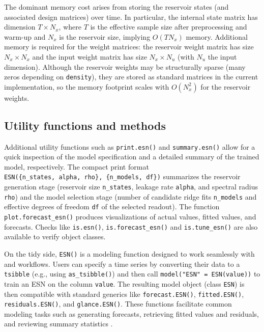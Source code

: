The dominant memory cost arises from storing the reservoir states (and associated design matrices) over time. In particular, the internal state matrix has dimension \(T \times N_x\), where \(T\) is the effective sample size after preprocessing and warm-up and \(N_x\) is the reservoir size, implying \(O(TN_x)\) memory. Additional memory is required for the weight matrices: the reservoir weight matrix has size \(N_x \times N_x\) and the input weight matrix has size \(N_x \times N_u\) (with \(N_u\) the input dimension). Although the reservoir weights may be structurally sparse (many zeros depending on \texttt{density}), they are stored as standard matrices in the current implementation, so the memory footprint scales with \(O(N_x^2)\) for the reservoir weights.

\subsection{Utility functions and methods}\label{utility-functions-and-methods}

Additional utility functions such as \texttt{print.esn()} and \texttt{summary.esn()} allow for a quick inspection of the model specification and a detailed summary of the trained model, respectively. The compact print format \texttt{ESN(\{n\_states,\ alpha,\ rho\},\ \{n\_models,\ df\})} summarizes the reservoir generation stage (reservoir size \texttt{n\_states}, leakage rate \texttt{alpha}, and spectral radius \texttt{rho}) and the model selection stage (number of candidate ridge fits \texttt{n\_models} and effective degrees of freedom \texttt{df} of the selected readout). The function \texttt{plot.forecast\_esn()} produces visualizations of actual values, fitted values, and forecasts. Checks like \texttt{is.esn()}, \texttt{is.forecast\_esn()} and \texttt{is.tune\_esn()} are also available to verify object classes.

On the tidy side, \texttt{ESN()} is a modeling function designed to work seamlessly with  and  workflows. Users can specify a time series by converting their data to a \texttt{tsibble} (e.g., using \texttt{as\_tsibble()}) and then call \texttt{model("ESN"\ =\ ESN(value))} to train an ESN on the column \texttt{value}. The resulting model object (class \texttt{ESN}) is then compatible with standard  generics like \texttt{forecast.ESN()}, \texttt{fitted.ESN()}, \texttt{residuals.ESN()}, and \texttt{glance.ESN()}. These functions facilitate common modeling tasks such as generating forecasts, retrieving fitted values and residuals, and reviewing summary statistics \citep{fable, fabletools, tsibble}.


